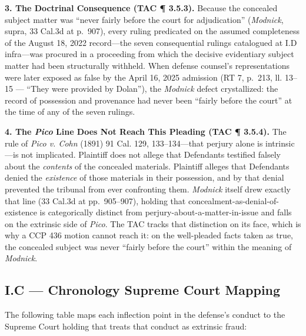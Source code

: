 \textbf{3. The Doctrinal Consequence (TAC ¶ 3.5.3).} Because the concealed subject matter was ``never fairly before the court for adjudication'' (\emph{Modnick}, supra, 33 Cal.3d at p.~907), every ruling predicated on the assumed completeness of the August 18, 2022 record---the seven consequential rulings catalogued at \textsection{} I.D infra---was procured in a proceeding from which the decisive evidentiary subject matter had been structurally withheld. When defense counsel's representations were later exposed as false by the April 16, 2025 admission (RT 7, p.~213, ll. 13--15 --- ``They were provided by Dolan''), the \emph{Modnick} defect crystallized: the record of possession and provenance had never been ``fairly before the court'' at the time of any of the seven rulings.

\textbf{4. The \emph{Pico} Line Does Not Reach This Pleading (TAC ¶ 3.5.4).} The rule of \emph{Pico v. Cohn} (1891) 91 Cal. 129, 133--134---that perjury alone is intrinsic---is not implicated. Plaintiff does not allege that Defendants testified falsely about the \emph{contents} of the concealed materials. Plaintiff alleges that Defendants denied the \emph{existence} of those materials in their possession, and by that denial prevented the tribunal from ever confronting them. \emph{Modnick} itself drew exactly that line (33 Cal.3d at pp.~905--907), holding that concealment-as-denial-of-existence is categorically distinct from perjury-about-a-matter-in-issue and falls on the extrinsic side of \emph{Pico}. The TAC tracks that distinction on its face, which is why a CCP \textsection{} 436 motion cannot reach it: on the well-pleaded facts taken as true, the concealed subject was never ``fairly before the court'' within the meaning of \emph{Modnick}.

\subsection{I.C --- Chronology {\textrightarrow{}} Supreme Court Mapping}\label{i.c-chronology-supreme-court-mapping}

The following table maps each inflection point in the defense's conduct to the Supreme Court holding that treats that conduct as extrinsic fraud:

